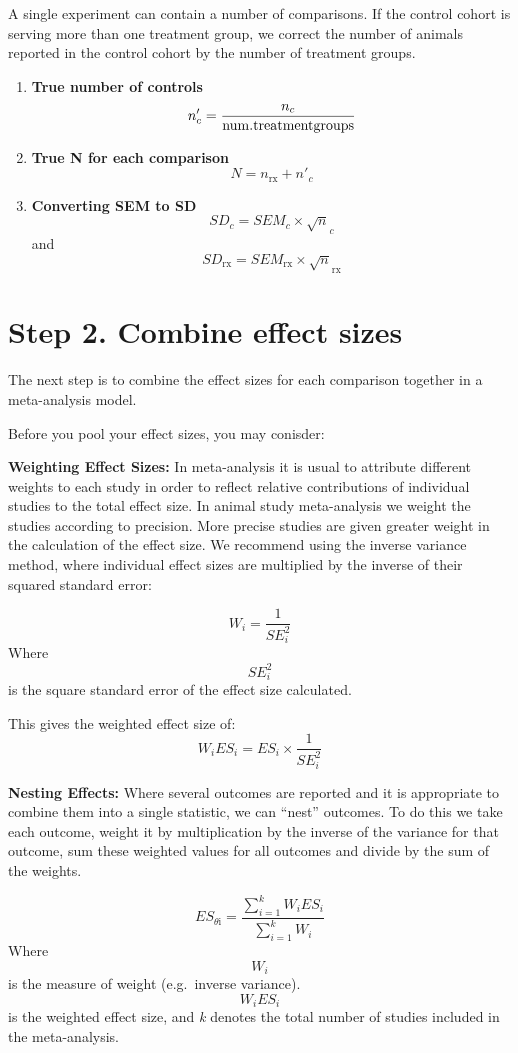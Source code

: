 \documentclass[
]{book}
\begin{document}
A single experiment can contain a number of comparisons. If the control cohort is serving more than one treatment group, we correct the number of animals reported in the control cohort by the number of treatment groups.

\begin{enumerate}
\def\labelenumi{(\arabic{enumi})}
\item
  \textbf{True number of controls}
  \[n'_c = \frac{n_c}{{\rm num. treatment groups}}\]
\item
  \textbf{True N for each comparison}
  \[N = n_{\text{rx}} + n'_c\]
\item
  \textbf{Converting SEM to SD}
  \[ SD_c = SEM_c \times \sqrt n_c \] and \[SD_{\text{rx}} = SEM_{\text{rx}} \times \sqrt n_{\text{rx}} \]
\end{enumerate}

\section{Step 2. Combine effect sizes}\label{step-2.-combine-effect-sizes}

The next step is to combine the effect sizes for each comparison together in a meta-analysis model.

Before you pool your effect sizes, you may conisder:

\textbf{Weighting Effect Sizes:}
In meta-analysis it is usual to attribute different weights to each study in order to reflect relative contributions of individual studies to the total effect size. In animal study meta-analysis we weight the studies according to precision. More precise studies are given greater weight in the calculation of the effect size. We recommend using the inverse variance method, where individual effect sizes are multiplied by the inverse of their squared standard error:

\[W_i = \frac{1}{SE^2_i} \]
Where \[{SE^2_i}\] is the square standard error of the effect size calculated.

This gives the weighted effect size of:
\[W_iES_i = ES_i \times \frac{1}{SE^2_i} \]

\textbf{Nesting Effects:}
Where several outcomes are reported and it is appropriate to combine them into a single statistic, we can ``nest'' outcomes. To do this we take each outcome, weight it by multiplication by the inverse of the variance for that outcome, sum these weighted values for all outcomes and divide by the sum of the weights.

\[ES_{\theta\text{i}} = \frac{\sum_{i=1}^{k} W_iES_i}{\sum_{i=1}^{k} W_i} \]
Where \[W_i\] is the measure of weight (e.g.~inverse variance). \[W_iES_i \] is the weighted effect size, and \emph{k} denotes the total number of studies included in the meta-analysis.
\end{document}
